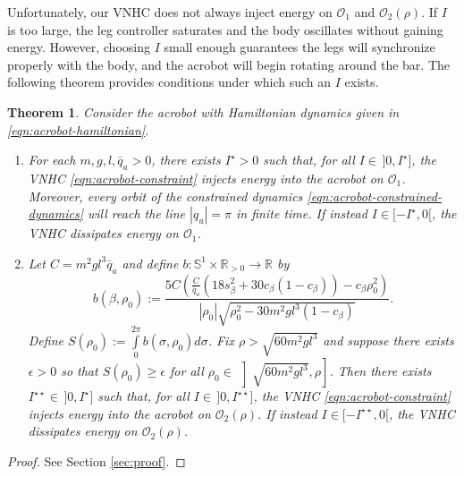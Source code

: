 \documentclass[journal,twoside,web, twocolumn,draftcls]{ieeecolor}
\newtheorem{thm}{Theorem}%
\newcommand*{\R}{\mathbb{R}}
\newcommand*{\Sone}{\mathbb{S}^1}
\newcommand*{\SxR}{\Sone \times \R}
\begin{document}
Unfortunately, our VNHC does not always inject energy on \(\mathcal{O}_1\) and
\(\mathcal{O}_2(\rho)\).
If \(I\) is too large, the leg controller saturates and the body oscillates
without gaining energy.
However, choosing \(I\) small enough guarantees the legs will synchronize
properly with the body, and the acrobot will begin rotating around the bar.
The following theorem provides conditions under which such an \(I\) exists.

\begin{thm}\label{thm:acrobot-energy-stabilization}
    Consider the acrobot with Hamiltonian dynamics given in
    \eqref{eqn:acrobot-hamiltonian}.
\begin{enumerate}
    \item For each \(m, g, l, \bar{q}_a > 0\), there exists
        \(I^\star > 0\) such that, for all \(I \in \, ]0,I^\star]\), the VNHC
        \eqref{eqn:acrobot-constraint} injects energy into the acrobot on
        \(\mathcal{O}_1\).
        Moreover, every orbit of the constrained dynamics 
        \eqref{eqn:acrobot-constrained-dynamics} will reach the line
        \(|q_u| = \pi\) in finite time.
        If instead \(I \in [-I^\star,0[\), the VNHC dissipates energy
        on \(\mathcal{O}_1\).
    \item Let \(C = m^2gl^3\bar{q}_a\) and 
        define \(b : \SxR_{> 0} \rightarrow \R\) by
    \[
        b(\beta,\rho_0) := 
        \frac{5C \left(
        \frac{C}{\bar{q}_a}\left(18s_\beta^2 + 30c_\beta(1 - c_\beta)\right)
            - c_\beta\rho_0^2
        \right)}{
        |\rho_0|\sqrt{\rho_0^2 - 30m^2gl^3(1 - c_\beta)}
        }
        .
    \]
        Define 
        \(S(\rho_0) := \int \limits_{0}^{2\pi} b(\sigma,\rho_0)d\sigma\).
        Fix \(\rho > \sqrt{60m^2gl^3}\) and
        suppose there exists \(\epsilon > 0\) so that 
        \(S(\rho_0) \geq \epsilon\) for all 
        \(\rho_0 \in \, \left]\sqrt{60m^2gl^3}, \rho\right]\).
        Then there exists \(I^{\star\star} \in \, ]0, I^\star]\) such that, for all 
        \(I \in \, ]0,I^{\star\star}]\), the VNHC
        \eqref{eqn:acrobot-constraint} injects energy into the acrobot on
        \(\mathcal{O}_2(\rho)\).
        If instead \(I \in [-I^{\star\star},0[\), the VNHC dissipates energy
        on \(\mathcal{O}_2(\rho)\).
\end{enumerate}
\end{thm}
\begin{proof}
    See Section \ref{sec:proof}.
\end{proof}
\end{document}
